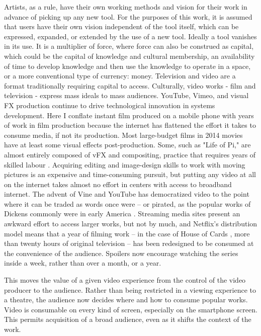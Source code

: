 Artists, as a rule, have their own working methods and vision for their work in advance of picking up any new tool. For the purposes of this work, it is assumed that users have their own vision independent of the tool itself, which can be expressed, expanded, or extended by the use of a new tool. Ideally a tool vanishes in its use. It is a multiplier of force, where force can also be construed as capital, which could be the capital of knowledge and cultural membership, an availability of time to develop knowledge and then use the knowledge to operate in a space, or a more conventional type of currency: money.
Television and video are a format traditionally requiring capital to access. Culturally, video works - film and television - express mass ideals to mass audiences. YouTube, Vimeo, and visual FX production continue to drive technological innovation in systems development. Here I conflate instant film produced on a mobile phone with years of work in film production because the internet has flattened the effort it takes to consume media, if not its production. Most large-budget films in 2014 movies have at least some visual effects post-production. Some, such as "Life of Pi," are almost entirely composed of vFX and compositing, practice that requires years of skilled labour \parencite{lifeofpi}. Acquiring editing and image-design skills to work with moving pictures is an expensive and time-consuming pursuit, but putting any video at all on the internet takes almost no effort in centers with access to broadband internet. The advent of Vine and YouTube has democratized video to the point where it can be traded as words once were – or pirated, as the popular works of Dickens commonly were in early America \parencite{dickenscastillo}. Streaming media sites present an awkward effort to access larger works, but not by much, and Netflix's distribution model means that a year of filming work – in the case of House of Cards \parencite{houseofcards}, more than twenty hours of original television – has been redesigned to be consumed at the convenience of the audience. Spoilers now encourage watching the series inside a week, rather than over a month, or a year.

This moves the value of a given video experience from the control of the video producer to the audience. Rather than being restricted in a viewing experience to a theatre, the audience now decides where and how to consume popular works. Video is consumable on every kind of screen, especially on the smartphone screen. This permits acquisition of a broad audience, even as it shifts the context of the work.

